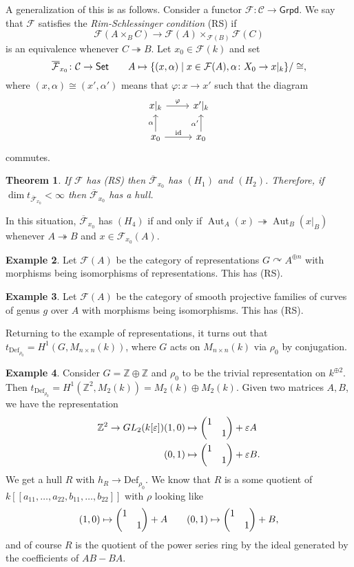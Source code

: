 \documentclass[leqno, openany]{memoir}
\newtheorem{thm}{Theorem}[section]
\theoremstyle{definition}
\newtheorem{exm}[thm]{Example}
\theoremstyle{remark}
\theoremstyle{plain}
\theoremstyle{definition}
\theoremstyle{remark}
\newcommand{\Z}{\mathbb{Z}}
\newcommand{\ep}{\varepsilon}
\newcommand{\mc}[1]{\mathcal{#1}}
\newcommand{\mr}[1]{\mathrm{#1}}
\newcommand{\ms}[1]{\mathsf{#1}}
\newcommand{\ol}[1]{\overline{#1}}
\DeclareMathOperator{\Aut}{Aut}
\begin{document}
A generalization of this is as follows. Consider a functor $\mc{F} \colon \mc{C} \to \ms{Grpd}$. We say that $\mc{F}$ satisfies the \textit{Rim-Schlessinger condition} (RS) if
\[ \mc{F}(A \times_B C) \to \mc{F}(A) \times_{\mc{F}(B)} \mc{F}(C) \]
is an equivalence whenever $C \twoheadrightarrow B$. Let $x_0 \in \mc{F}(k)$ and set 
\[ \ol{\mc{F}}_{x_0} \colon \mc{C} \to \ms{Set} \qquad A \mapsto \qty{(x, \alpha) \mid x \in \mc{F}(A), \alpha \colon X_0 \to x|_k} / \cong, \]
where $(x,\alpha) \cong (x', \alpha')$ means that $\varphi \colon x \to x'$ such that the diagram
\begin{equation*}
\begin{tikzcd}
    x|_k \ar{r}{\varphi} & x'|_k \\
    x_0 \ar{r}{\mr{id}} \ar{u}{\alpha} & x_0 \ar{u}{\alpha'}
\end{tikzcd}
\end{equation*}
commutes.

\begin{thm}
    If $\mc{F}$ has (RS) then $\ol{\mc{F}}_{x_0}$ has $(H_1)$ and $(H_2)$. Therefore, if $\dim t_{\ol{\mc{F}}_{x_0}} < \infty$ then $\ol{\mc{F}}_{x_0}$ has a hull.
\end{thm}

In this situation, $\ol{\mc{F}}_{x_0}$ has $(H_4)$ if and only if $\Aut_A(x) \twoheadrightarrow \Aut_B(x|_B)$ whenever $A \twoheadrightarrow B$ and $x \in \mc{F}_{x_0}(A)$.

\begin{exm}
    Let $\mc{F}(A)$ be the category of representations $G \curvearrowright A^{\oplus n}$ with morphisms being isomorphisms of representations. This has (RS).
\end{exm}

\begin{exm}
    Let $\mc{F}(A)$ be the category of smooth projective families of curves of genus $g$ over $A$ with morphisms being isomorphisms. This has (RS).
\end{exm}

Returning to the example of representations, it turns out that $t_{\mr{Def}_{\rho_0}} = H^1(G, M_{n \times n}(k))$, where $G$ acts on $M_{n \times n}(k)$ via $\rho_0$ by conjugation.

\begin{exm}
    Consider $G = \Z \oplus \Z$ and $\rho_0$ to be the trivial representation on $k^{\oplus 2}$. Then $t_{\mr{Def}_{\rho_0}} = H^1(\Z^2, M_2(k)) = M_2(k) \oplus M_2(k)$. Given two matrices $A, B$, we have the representation
    \begin{align*}
        \Z^2 \to GL_2(k[\ep]) & (1,0) \mapsto \mqty(\dmat{1,1}) + \ep A \\
        & (0,1) \mapsto \mqty(\dmat{1,1}) + \ep B.
    \end{align*}
    We get a hull $R$ with $h_R \to \mr{Def}_{\rho_0}$. We know that $R$ is a some quotient of $k[[a_{11}, \ldots, a_{22}, b_{11}, \ldots, b_{22}]]$ with $\rho$ looking like
    \[ (1,0) \mapsto \mqty(\dmat{1,1}) + A \qquad (0,1) \mapsto \mqty(\dmat{1,1}) + B, \]
    and of course $R$ is the quotient of the power series ring by the ideal generated by the coefficients of $AB - BA$.
\end{exm}
\end{document}
